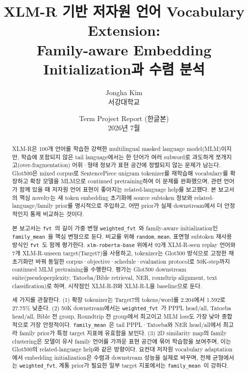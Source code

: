 \documentclass[11pt,a4paper]{article}
\title{XLM-R 기반 저자원 언어 Vocabulary Extension:\\ Family-aware Embedding Initialization과 수렴 분석}
\author{Jongha Kim \\
서강대학교}
\date{Term Project Report (한글본) \\ 2026년 7월}
\newcommand{\rand}{\texttt{random}}
\newcommand{\meanm}{\texttt{mean}}
\newcommand{\fvt}{\texttt{fvt}}
\newcommand{\wfvt}{\texttt{weighted\_fvt}}
\newcommand{\famm}{\texttt{family\_mean}}
\begin{document}
\maketitle

\begin{abstract}
\noindent
XLM-R은 100개 언어를 학습한 강력한 multilingual masked language model(MLM)이지만, 학습에 포함되지 않은 tail language에서는 한 단어가 여러 subword로 과도하게 쪼개지고(over-fragmentation) 어휘·형태 정보가 표현 공간에 정렬되지 않는 문제가 남는다. Glot500은 mixed corpus로 SentencePiece unigram tokenizer를 재학습해 vocabulary를 확장하고 확장 모델을 MLM으로 continued pretraining하여 이 문제를 완화했으며, 관련 언어가 함께 있을 때 저자원 언어 표현이 좋아지는 related-language help를 보고했다. 본 보고서의 핵심 novelty는 새 token embedding 초기화에 source subtoken 정보와 related-language/family prior를 명시적으로 주입하고, 어떤 prior가 실제 downstream에서 더 안정적인지 통제 비교하는 것이다.

본 보고서는 \fvt\ 의 길이 가중 변형 \wfvt\ 와 family-aware initialization인 \famm\ 을 핵심 변형으로 둔다. 비교를 위해 \rand, \meanm, 표면형 subtoken 재사용 방식인 \fvt\ 도 함께 평가한다. \texttt{xlm-roberta-base} 위에서 92개 XLM-R-seen replay 언어와 7개 XLM-R-unseen target(Target7)을 사용하고, tokenizer는 Glot500 방식으로 고정한 채 초기화만 바꿔 동일한 corpus·objective·schedule·evaluation protocol로 50K-step까지 continued MLM pretraining을 수행한다. 평가는 Glot500 downstream suite(pseudoperplexity, Tatoeba/Bible retrieval, NER, roundtrip alignment, text classification)로 하며, 시작점인 XLM-R-B와 XLM-R-L을 baseline으로 둔다.

세 가지를 관찰한다. (1) 확장 tokenizer는 Target7의 tokens/word를 2.204에서 1.592로 27.75\% 낮춘다. (2) 50K downstream에서는 \wfvt\ 가 PPPL head/all, Tatoeba head/all, Bible 전 group, Roundtrip 전 group에서 최고이고 MLM loss도 가장 낮아 종합적으로 가장 안정적이다. \famm\ 은 tail PPPL·Tatoeba와 NER head/all에서 최고라 family prior가 특정 target 지표에 유효함을 보인다. (3) 2D similarity map의 family clustering은 모델이 유사 family 언어를 가까운 표현 공간에 묶어 학습함을 보여주며, 이는 Glot500의 related-language help와 같은 방향이다. 요컨대 저자원 vocabulary adaptation에서 embedding initialization은 수렴과 downstream 성능을 실제로 바꾸며, 전체 균형에서는 \wfvt, 계통 prior가 필요한 일부 target 지표에서는 \famm\ 이 강하다.
\end{abstract}

\end{document}

